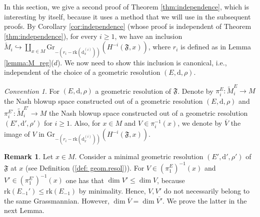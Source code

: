 \documentclass[10pt]{article}
\theoremstyle{plain}
\theoremstyle{definition}
\newtheorem{remark}[lemma]{Remark}
\theoremstyle{remark}
\newtheorem{convention}[lemma]{Convention}
\newcommand{\dd}{\mathrm{d}}
\begin{document}
In this section, we give a second proof of Theorem \ref{thm:independence}, which is interesting by itself, because it uses a method that we will use in the subsequent proofs. By Corollary \ref{cor:independence} (whose
proof is independent of Theorem \ref{thm:independence}), for every $i\geq 1$, we have an inclusion  $\widetilde M_i\hookrightarrow \coprod_{x\in M}\mathrm{Gr}_{-\left(r_i-\mathrm{rk}\left(\dd^{(i)}_x\right)\right)}(H^{-i}(\mathfrak{F},{x}))$, where $r_i$ is defined as in Lemma \ref{lemma:M_reg}($d$).  We now need to show this inclusion is canonical, i.e., independent of the choice of a geometric resolution $(E, \dd, \rho)$.

\begin{convention}
For $(E,\dd,\rho)$  a geometric resolution of $\mathfrak F$.  Denote by $\pi_i^E\colon \widetilde M_i^E\to M$ the Nash blowup space  constructed out of a geometric resolution $(E, \dd, \rho)$ and $\pi_i^{E'}\colon \widetilde M_i^{E'}\to M$ the Nash blowup space constructed out of a geometric resolution $(E', \dd', \rho')$ for $i\geq 1$. Also, for $x\in M$ and  $V\in \pi^{-1}_i(x)$, we denote by $\overline{V}$ the image of $V$ in $\mathrm{Gr}_{-\left(r_i-\mathrm{rk}\left(\dd^{(i)}_x\right)\right)}(H^{-i}(\mathfrak{F},{x}))$.
\end{convention}
\begin{remark}
Let $x\in M$. Consider a minimal geometric resolution $(E', \dd', \rho')$ of $\mathfrak F$ at $x$ (see Definition (\ref{def: geom.resol})). For $V\in(\pi_1^E)^{-1}(x)$ and $V'\in(\pi_1^{E'})^{-1}(x)$ one has that $\dim V'\leq \dim V$, because $\mathrm{rk}(E_{-1}')\leq \mathrm{rk}(E_{-1})$ by minimality. Hence, $V, V'$ do not necessarily belong to the same Grassmannian. However,  $\dim \overline{V}=\dim \overline{V'}$. We prove the latter in the next Lemma. %
\end{remark}

\end{document}
